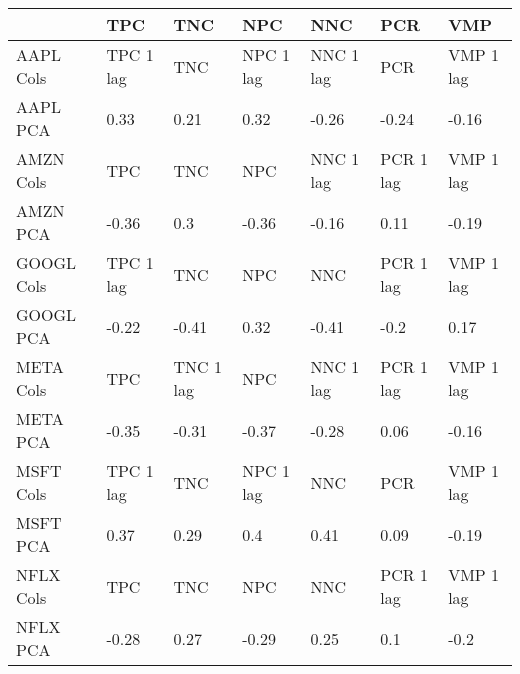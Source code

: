 \begin{tabular}{lllllll}
\toprule
{} &        TPC &        TNC &        NPC &        NNC &        PCR &        VMP \\
\midrule
AAPL Cols  &  TPC 1 lag &        TNC &  NPC 1 lag &  NNC 1 lag &        PCR &  VMP 1 lag \\
AAPL PCA   &       0.33 &       0.21 &       0.32 &      -0.26 &      -0.24 &      -0.16 \\
AMZN Cols  &        TPC &        TNC &        NPC &  NNC 1 lag &  PCR 1 lag &  VMP 1 lag \\
AMZN PCA   &      -0.36 &        0.3 &      -0.36 &      -0.16 &       0.11 &      -0.19 \\
GOOGL Cols &  TPC 1 lag &        TNC &        NPC &        NNC &  PCR 1 lag &  VMP 1 lag \\
GOOGL PCA  &      -0.22 &      -0.41 &       0.32 &      -0.41 &       -0.2 &       0.17 \\
META Cols  &        TPC &  TNC 1 lag &        NPC &  NNC 1 lag &  PCR 1 lag &  VMP 1 lag \\
META PCA   &      -0.35 &      -0.31 &      -0.37 &      -0.28 &       0.06 &      -0.16 \\
MSFT Cols  &  TPC 1 lag &        TNC &  NPC 1 lag &        NNC &        PCR &  VMP 1 lag \\
MSFT PCA   &       0.37 &       0.29 &        0.4 &       0.41 &       0.09 &      -0.19 \\
NFLX Cols  &        TPC &        TNC &        NPC &        NNC &  PCR 1 lag &  VMP 1 lag \\
NFLX PCA   &      -0.28 &       0.27 &      -0.29 &       0.25 &        0.1 &       -0.2 \\
\bottomrule
\end{tabular}
